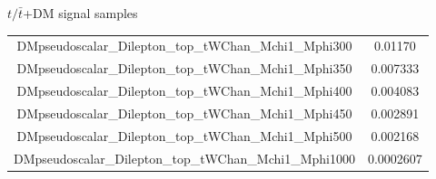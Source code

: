 \documentclass[8pt]{beamer}
\begin{document}
\begin{frame}{$t/\bar t$+DM signal samples}
\begin{table}
\begin{center}
{\begin{tabular}{ c|c }
 DMpseudoscalar\_Dilepton\_top\_tWChan\_Mchi1\_Mphi300 & 0.01170 \\
 DMpseudoscalar\_Dilepton\_top\_tWChan\_Mchi1\_Mphi350 & 0.007333 \\
 DMpseudoscalar\_Dilepton\_top\_tWChan\_Mchi1\_Mphi400 & 0.004083 \\
 DMpseudoscalar\_Dilepton\_top\_tWChan\_Mchi1\_Mphi450 & 0.002891 \\
 DMpseudoscalar\_Dilepton\_top\_tWChan\_Mchi1\_Mphi500 & 0.002168 \\
 DMpseudoscalar\_Dilepton\_top\_tWChan\_Mchi1\_Mphi1000 & 0.0002607 \\
 \hline
\end{tabular}
}
\end{center}
\end{table}
\end{frame}
\end{document}
